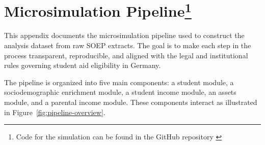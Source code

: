 


\newpage
\section[Microsimulation Pipeline]{Microsimulation Pipeline\footnote{ 
Code for the simulation can be found in the GitHub repository \cite{bystrom2025msc}}
}
\label{appendix:microsimulation-pipeline}

This appendix documents the microsimulation pipeline used to construct the analysis dataset from raw SOEP extracts. The goal is to make each step in the process transparent, reproducible, and aligned with the legal and institutional rules governing student aid eligibility in Germany.

The pipeline is organized into five main components: a student module, a sociodemographic enrichment module, a student income module, an assets module, and a parental income module. These components interact as illustrated in Figure~\ref{fig:pipeline-overview}.

